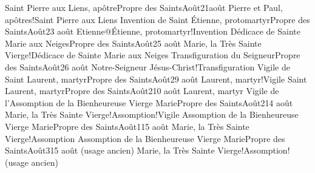 \documentclass[twoside, french]{book}
\begin{document}
        {Saint Pierre aux Liens, apôtre}{Propre des Saints}{Août}{2}{1\ier août}
        {}{}{Pierre et Paul, apôtres!Saint Pierre aux Liens}{}{}
        {Invention de Saint Étienne, protomartyr}{Propre des Saints}{Août}{2}{3 août}
        {}{}{Etienne@Étienne, protomartyr!Invention}{}{}
        {Dédicace de Sainte Marie aux Neiges}{Propre des Saints}{Août}{2}{5 août}
        {}{}{Marie, la Très Sainte Vierge!Dédicace de Sainte Marie aux Neiges}{}{}
        {Transfiguration du Seigneur}{Propre des Saints}{Août}{2}{6 août}
        {}{}{Notre-Seigneur Jésus-Christ!Transfiguration}{}{}
        {Vigile de Saint Laurent, martyr}{Propre des Saints}{Août}{2}{9 août}
        {}{}{Laurent, martyr!Vigile}{}{}
        {Saint Laurent, martyr}{Propre des Saints}{Août}{2}{10 août}
        {}{}{Laurent, martyr}{}{}
        {Vigile de l’Assomption de la Bienheureuse Vierge Marie}{Propre des Saints}{Août}{2}{14 août}
        {}{}{Marie, la Très Sainte Vierge!Assomption!Vigile}{}{}
        {Assomption de la Bienheureuse Vierge Marie}{Propre des Saints}{Août}{1}{15 août}
        {}{}{Marie, la Très Sainte Vierge!Assomption}{}{}
        {Assomption de la Bienheureuse Vierge Marie}{Propre des Saints}{Août}{3}{15 août (usage ancien)}
        {}{}{Marie, la Très Sainte Vierge!Assomption!(usage ancien)}{}{}
\end{document}
